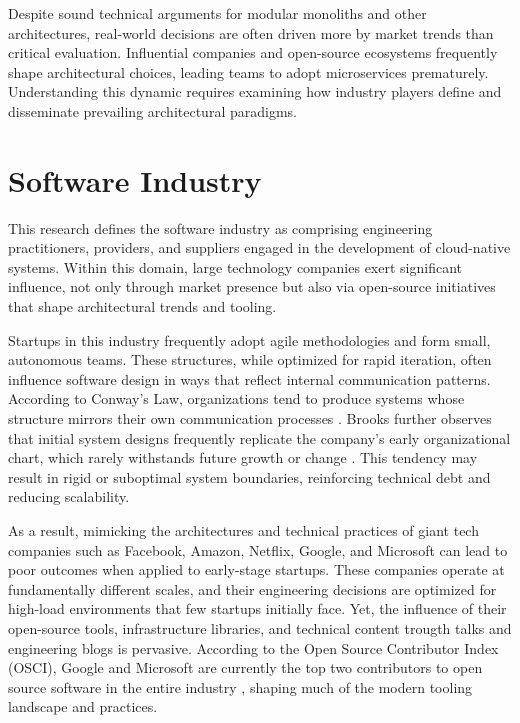 Despite sound technical arguments for modular monoliths and other architectures, real-world decisions are often driven more by market trends than critical evaluation. Influential companies and open-source ecosystems frequently shape architectural choices, leading teams to adopt microservices prematurely. Understanding this dynamic requires examining how industry players define and disseminate prevailing architectural paradigms.



\section{Software Industry}
This research defines the software industry as comprising engineering practitioners, providers, and suppliers engaged in the development of cloud-native systems. Within this domain, large technology companies exert significant influence, not only through market presence but also via open-source initiatives that shape architectural trends and tooling.

Startups in this industry frequently adopt agile methodologies and form small, autonomous teams. These structures, while optimized for rapid iteration, often influence software design in ways that reflect internal communication patterns. According to Conway's Law, organizations tend to produce systems whose structure mirrors their own communication processes \cite{conway2003}. Brooks further observes that initial system designs frequently replicate the company's early organizational chart, which rarely withstands future growth or change \cite{brooks1995}. This tendency may result in rigid or suboptimal system boundaries, reinforcing technical debt and reducing scalability.

As a result, mimicking the architectures and technical practices of giant tech companies such as Facebook, Amazon, Netflix, Google, and Microsoft can lead to poor outcomes when applied to early-stage startups. These companies operate at fundamentally different scales, and their engineering decisions are optimized for high-load environments that few startups initially face. Yet, the influence of their open-source tools, infrastructure libraries, and technical content trougth talks and engineering blogs is pervasive. According to the Open Source Contributor Index (OSCI), Google and Microsoft are currently the top two contributors to open source software in the entire industry \cite{osci2024}, shaping much of the modern tooling landscape and practices.

